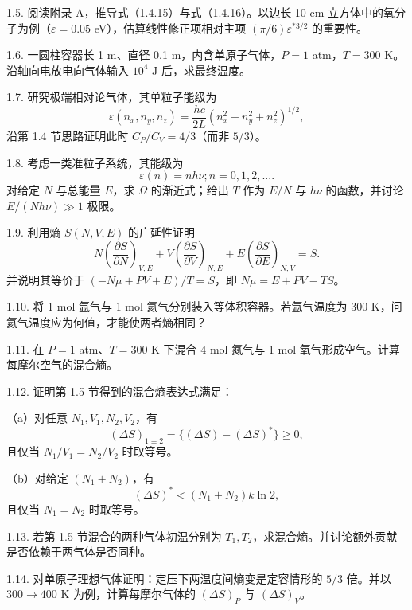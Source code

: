 1.5. 阅读附录 A，推导式（1.4.15）与式（1.4.16）。以边长 10 cm 立方体中的氧分子为例（\(\varepsilon=0.05\) eV），估算线性修正项相对主项 \((\pi/6)\varepsilon^{*3/2}\) 的重要性。

1.6. 一圆柱容器长 1 m、直径 0.1 m，内含单原子气体，\(P=1\) atm，\(T=300\) K。沿轴向电放电向气体输入 \(10^4\) J 后，求最终温度。

1.7. 研究极端相对论气体，其单粒子能级为
\begin{equation}\tag{1.3.72}\label{eq:1.3.72}
\varepsilon ( n _ { x } , n _ { y } , n _ { z } ) = \frac { h c } { 2 L } \left( n _ { x } ^{2} + n _ { y } ^{2} + n _ { z } ^{2} \right) ^{1 / 2} ,
\end{equation}
沿第 1.4 节思路证明此时 \(C_P/C_V=4/3\)（而非 \(5/3\)）。

1.8. 考虑一类准粒子系统，其能级为
\begin{equation}\tag{1.3.73}\label{eq:1.3.73}
\varepsilon ( n ) = n h \nu ;  n = 0 , 1 , 2 , . . . .
\end{equation}
对给定 \(N\) 与总能量 \(E\)，求 \(\Omega\) 的渐近式；给出 \(T\) 作为 \(E/N\) 与 \(h\nu\) 的函数，并讨论 \(E/(Nh\nu)\gg1\) 极限。

1.9. 利用熵 \(S(N,V,E)\) 的广延性证明
\begin{equation}\tag{1.3.74}\label{eq:1.3.74}
N  \left( \frac { \partial S } { \partial N } \right) _ { V , E } + V  \left( \frac { \partial S } { \partial V } \right) _ { N , E } + E  \left( \frac { \partial S } { \partial E } \right) _ { N , V } = S .
\end{equation}
并说明其等价于 \((-N\mu+PV+E)/T=S\)，即 \(N\mu=E+PV-TS\)。

1.10. 将 1 mol 氩气与 1 mol 氦气分别装入等体积容器。若氩气温度为 300 K，问氦气温度应为何值，才能使两者熵相同？

1.11. 在 \(P=1\) atm、\(T=300\) K 下混合 4 mol 氮气与 1 mol 氧气形成空气。计算每摩尔空气的混合熵。

1.12. 证明第 1.5 节得到的混合熵表达式满足：

（a）对任意 \(N_1,V_1,N_2,V_2\)，有
\[
(\Delta S)_{1\equiv2}=\{(\Delta S)-(\Delta S)^*\}\ge 0,
\]
且仅当 \(N_1/V_1=N_2/V_2\) 时取等号。

（b）对给定 \((N_1+N_2)\)，有
\[
(\Delta S)^* < (N_1+N_2)k\ln 2,
\]
且仅当 \(N_1=N_2\) 时取等号。

1.13. 若第 1.5 节混合的两种气体初温分别为 \(T_1,T_2\)，求混合熵。并讨论额外贡献是否依赖于两气体是否同种。

1.14. 对单原子理想气体证明：定压下两温度间熵变是定容情形的 \(5/3\) 倍。并以 \(300\to 400\) K 为例，计算每摩尔气体的 \((\Delta S)_P\) 与 \((\Delta S)_V\)。

